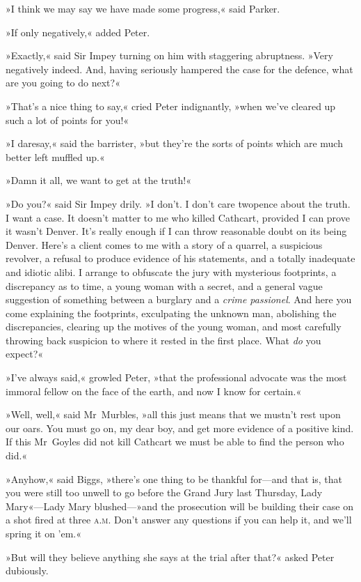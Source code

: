 »I think we may say we have made some progress,« said Parker.

»If only negatively,« added Peter.

»Exactly,« said Sir Impey turning on him with staggering abruptness.  »Very negatively indeed. And, having seriously hampered the case for the defence, what are you going to do next?«

»That's a nice thing to say,« cried Peter indignantly, »when we've cleared up such a lot of points for you!«

»I daresay,« said the barrister, »but they're the sorts of points which are much better left muffled up.«

»Damn it all, we want to get at the truth!«

»Do you?« said Sir Impey drily. »I don't. I don't care twopence about the truth. I want a case. It doesn't matter to me who killed Cathcart, provided I can prove it wasn't Denver. It's really enough if I can throw reasonable doubt on its being Denver. Here's a client comes to me with a story of a quarrel, a suspicious revolver, a refusal to produce evidence of his statements, and a totally inadequate and idiotic alibi. I arrange to obfuscate the jury with mysterious footprints, a discrepancy as to time, a young woman with a secret, and a general vague suggestion of something between a burglary and a \textit{crime passionel}. And here you come explaining the footprints, exculpating the unknown man, abolishing the discrepancies, clearing up the motives of the young woman, and most carefully throwing back suspicion to where it rested in the first place. What \textit{do} you expect?«

»I've always said,« growled Peter, »that the professional advocate was the most immoral fellow on the face of the earth, and now I know for certain.«

»Well, well,« said Mr~Murbles, »all this just means that we mustn't rest upon our oars. You must go on, my dear boy, and get more evidence of a positive kind. If this Mr~Goyles did not kill Cathcart we must be able to find the person who did.«

»Anyhow,« said Biggs, »there's one thing to be thankful for—and that is, that you were still too unwell to go before the Grand Jury last Thursday, Lady Mary«—Lady Mary blushed—»and the prosecution will be building their case on a shot fired at three \textsc{a.m.} Don't answer any questions if you can help it, and we'll spring it on 'em.«

»But will they believe anything she says at the trial after that?« asked Peter dubiously.

